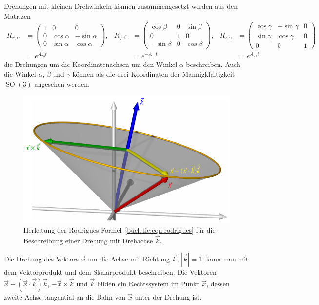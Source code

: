 Drehungen mit kleinen Drehwinkeln können zusammengesetzt werden
aus den Matrizen
\begin{align*}
R_{x,\alpha}
&=
\begin{pmatrix}
1&0&0\\
0&\cos\alpha&-\sin\alpha\\
0&\sin\alpha& \cos\alpha
\end{pmatrix},
&
R_{y,\beta}
&=
\begin{pmatrix}
 \cos\beta&0&\sin\beta\\
      0    &1&     0    \\
-\sin\beta&0&\cos\beta
\end{pmatrix},
&
R_{z,\gamma}
&=
\begin{pmatrix}
\cos\gamma&-\sin\gamma&0\\
\sin\gamma& \cos\gamma&0\\
    0     &     0     &1
\end{pmatrix}
\\
&=
e^{A_{23}t}
&
&=
e^{-A_{13}t}
&
&=
e^{A_{21}t}
\end{align*}
die Drehungen um die Koordinatenachsen um den Winkel $\alpha$
beschreiben.
Auch die Winkel $\alpha$, $\beta$ und $\gamma$ können als die
drei Koordinaten der Mannigkfaltigkeit $\operatorname{SO}(3)$
angesehen werden.

\begin{figure}
\centering
\includegraphics{chapters/60-gruppen/images/rodriguez.pdf}
\caption{Herleitung der Rodrigues-Formel~\eqref{buch:lie:eqn:rodrigues}
für die Beschreibung einer
Drehung mit Drehachse $\vec{k}$.
\label{buch:lie:fig:rodrigues}}
\end{figure}
Die Drehung des Vektors $\vec{x}$ um die Achse mit Richtung $\vec{k}$,
$|\vec{k}|=1$, kann man mit dem Vektorprodukt und dem Skalarprodukt
beschreiben.
Die Vektoren $\vec{x}-(\vec{x}\cdot\vec{k})\vec{k}$, $-\vec{x}\times\vec{k}$
und $\vec{k}$ bilden ein Rechtssystem im Punkt $\vec{x}$, dessen zweite
Achse tangential an die Bahn von $\vec{x}$ unter der Drehung ist.


